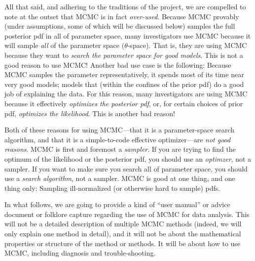 \documentclass[12pt,twoside,pdftex]{article}
\newcommand{\pars}{\theta}
\begin{document}
All that said, and adhering to the traditions of the  project, we are
compelled to note at the outset that MCMC is in fact \emph{over-used}.
Because MCMC provably (under assumptions, some of which will be discussed below) samples the full
posterior pdf in all of parameter space, many investigators use MCMC
because it will sample \emph{all} of the parameter space
($\pars$-space).
That is, they are using MCMC because they want to
\emph{search the parameter space for good models}.
This is not a good reason to use MCMC!
Another bad use case is the following:
Because MCMC samples the parameter representatively, it spends most of
its time near very good models; models that (within the confines of
the prior pdf) do a good job of explaining the data.
For this reason, many investigators are using MCMC because it
effectively \emph{optimizes the posterior pdf}, or, for certain
choices of prior pdf, \emph{optimizes the likelihood}.
This is another bad reason!

Both of these reasons for using MCMC---that it is a parameter-space
search algorithm, and that it is a simple-to-code effective
optimizer---are \emph{not good reasons}.  MCMC is first and foremost a
\emph{sampler}.  If you are trying to find the optimum of the
likelihood or the posterior pdf, you should use an \emph{optimzer},
not a sampler.  If you want to make sure you search all of parameter
space, you should use a \emph{search algorithm}, not a sampler.  MCMC
is good at one thing, and one thing only: Sampling ill-normalized (or
otherwise hard to sample) pdfs.

In what follows, we are going to provide a kind of ``user manual'' or
advice document or folklore capture regarding the use of MCMC for
data analysis.
This will not be a detailed description of multiple MCMC methods
(indeed, we will only explain one method in detail), and it will not
be about the mathematical properties or structure of the method or
methods.
It will be about how to use MCMC, including diagnosis and
trouble-shooting.
\end{document}
